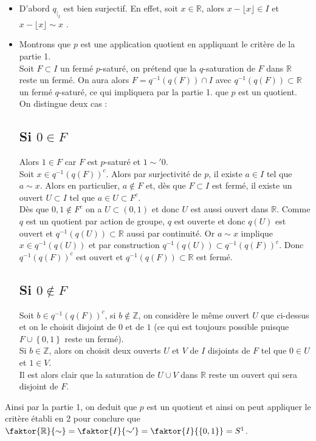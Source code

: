 \documentclass[11pt, a4paper]{article}
\begin{document}
\begin{itemize}
\item D'abord $q_{\vert_I}$ est bien surjectif. En effet, soit $x\in \mathbb{R}$, alors $x- \lfloor x\rfloor\in I$ et $ x- \lfloor x \rfloor \sim x$ .
\item Montrons que \(p\) est une application quotient en appliquant le critère de la partie 1. \\
Soit $ F\subset I$ un fermé \(p\)-saturé, on prétend que la \(q\)-saturation de $F$ dans $ \mathbb{R}$ reste un fermé. On aura alors \(F = q^{-1}(q(F))\cap I\) avec \(q^{-1}(q(F))\subset \mathbb{R}\) un fermé \(q\)-saturé, ce qui impliquera par la partie 1. que \(p\) est un quotient. \\
On distingue deux cas : 

\subsection*{Si $ 0 \in F$ }
Alors \(1\in F\) car \(F\) est \(p\)-saturé et \(1\sim'0\). \\
Soit \(x\in q^{-1}(q(F))^c\). Alors par surjectivité de \(p\), il existe \(a\in I\) tel que \(a\sim x\). Alors en particulier, \(a\not\in F\) et, dès que \(F\subset I\) est fermé, il existe un ouvert \(U\subset I\) tel que \(a\in U \subset F^c\). \\
Dès que \(0,1\notin F^c\) on a \(U\subset (0,1)\) et donc \(U\) est aussi ouvert dans \(\mathbb{R}\). Comme \(q\) est un quotient par action de groupe, \(q\) est ouverte et donc \(q(U)\) est ouvert et \(q^{-1}(q(U))\subset \mathbb{R}\) aussi par continuité. Or \(a\sim x\) implique \(x\in q^{-1}(q(U))\) et par construction \(q^{-1}(q(U)) \subset q^{-1}(q(F))^c\). Donc \(q^{-1}(q(F))^c\) est ouvert et \(q^{-1}(q(F)) \subset \mathbb{R}\) est fermé.  \\
\subsection*{ Si $ 0\notin F$ }
	Soit $ b \in q^{-1}( q( F) )^{c} $, si $ b \notin \mathbb{Z}$, on considère le même ouvert $U$ que ci-dessus et on le choisit disjoint de $ 0$ et de $1$ (ce qui est toujours possible puisque $ F \cup \left\{ 0,1 \right\} $  reste un fermé).\\
	Si $ b \in \mathbb{Z}$, alors on choisit deux ouverts $U$ et $V$ de $I$ disjoints de $F$ tel que $ 0\in U$ et $ 1\in V$.\\
	Il est alors clair que la saturation de $U\cup V$ dans $ \mathbb{R}$ reste un ouvert qui sera disjoint de $F$.
\end{itemize}

\noindent Ainsi par la partie 1, on deduit que $ p$ est un quotient et ainsi on peut appliquer le critère établi en 2 pour conclure que $\faktor  { \mathbb{R} } { \sim} = \faktor { I} { \sim '} = \faktor { I} { \left\{ 0,1 \right\}  } = S^{1}$. 
\end{document}
